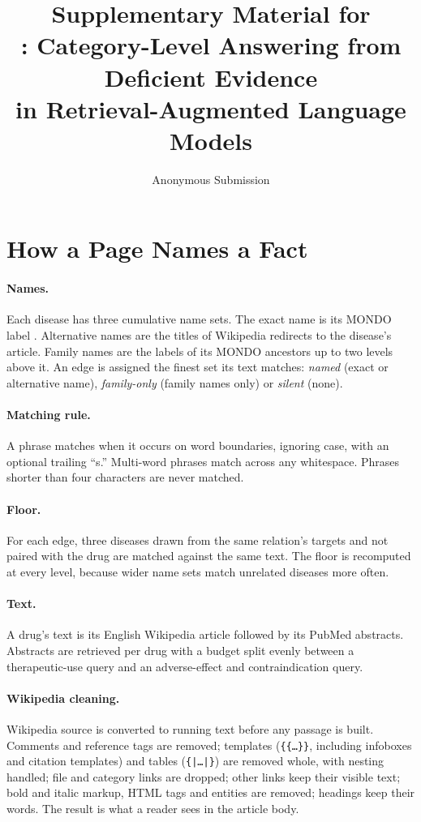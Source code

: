 \documentclass[letterpaper]{article} %
\title{Supplementary Material for\\\clade{}: Category-Level Answering from Deficient Evidence\\in Retrieval-Augmented Language Models}
\author{Anonymous Submission}
\begin{document}
\maketitle

\section{How a Page Names a Fact}

\paragraph{Names.}
Each disease has three cumulative name sets. The exact name is its MONDO label
\citep{vasilevsky2022mondo}. Alternative names are the titles of Wikipedia
redirects to the disease's article. Family names are the labels of its MONDO
ancestors up to two levels above it. An edge is assigned the finest set its
text matches: \emph{named} (exact or alternative name), \emph{family-only}
(family names only) or \emph{silent} (none).

\paragraph{Matching rule.}
A phrase matches when it occurs on word boundaries, ignoring case, with an
optional trailing ``s.'' Multi-word phrases match across any whitespace.
Phrases shorter than four characters are never matched.

\paragraph{Floor.}
For each edge, three diseases drawn from the same relation's targets and not
paired with the drug are matched against the same text. The floor is
recomputed at every level, because wider name sets match unrelated diseases
more often.

\paragraph{Text.}
A drug's text is its English Wikipedia article followed by its PubMed
abstracts. Abstracts are retrieved per drug with a budget split evenly between
a therapeutic-use query and an adverse-effect and contraindication query.

\paragraph{Wikipedia cleaning.}
Wikipedia source is converted to running text before any passage is built.
Comments and reference tags are removed; templates (\texttt{\{\{\ldots\}\}},
including infoboxes and citation templates) and tables
(\texttt{\{|\ldots|\}}) are removed whole, with nesting handled; file and
category links are dropped; other links keep their visible text; bold and
italic markup, HTML tags and entities are removed; headings keep their words.
The result is what a reader sees in the article body.
\end{document}
